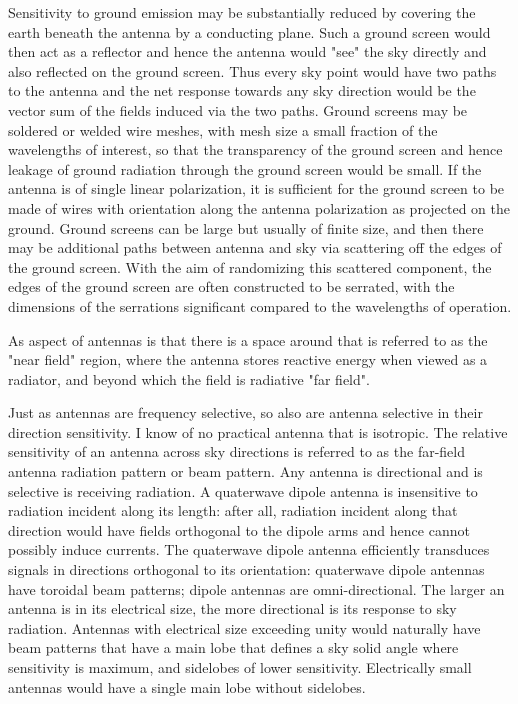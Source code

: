   Sensitivity to ground emission may be substantially reduced by covering the earth beneath the antenna by a conducting plane.  Such a ground screen would then act as a reflector and hence the antenna would "see" the sky directly and also reflected on the ground screen.  Thus every sky point would have two paths to the antenna and the net response towards any sky direction would be the vector sum of the fields induced via the two paths.  Ground screens may be soldered or welded wire meshes, with mesh size a small fraction of the wavelengths of interest, so that the transparency of the ground screen and hence leakage of ground radiation through the ground screen would be small. If the antenna is of single linear polarization, it is sufficient for the ground screen to be made of wires with orientation along the antenna polarization as projected on the ground.  Ground screens can be large but usually of finite size, and then there may be additional paths between antenna and sky via scattering off the edges of the ground screen.  With the aim of randomizing this scattered component, the edges of the ground screen are often constructed to be serrated, with the dimensions of the serrations significant compared to the wavelengths of operation. 
  
  As aspect of antennas is that there is a space around that is referred to as the "near field" region, where the antenna stores reactive energy when viewed as a radiator, and beyond which the field is radiative "far field".
  
  Just as antennas are frequency selective, so also are antenna selective in their direction sensitivity.  I know of no practical antenna that is isotropic.  The relative sensitivity of an antenna across sky directions is referred to as the far-field antenna radiation pattern or beam pattern.  Any antenna is directional and is selective is receiving radiation. A quaterwave dipole antenna is insensitive to radiation incident along its length: after all, radiation incident along that direction would have fields orthogonal to the dipole arms and hence cannot possibly induce currents.  The quaterwave dipole antenna efficiently transduces signals in directions orthogonal to its orientation: quaterwave dipole antennas have toroidal beam patterns; dipole antennas are omni-directional. The larger an antenna is in its electrical size, the more directional is its response to sky radiation.  Antennas with electrical size exceeding unity would naturally have beam patterns that have a main lobe that defines a sky solid angle where sensitivity is maximum, and sidelobes of lower sensitivity.  Electrically small antennas would have a single main lobe without sidelobes.
  
